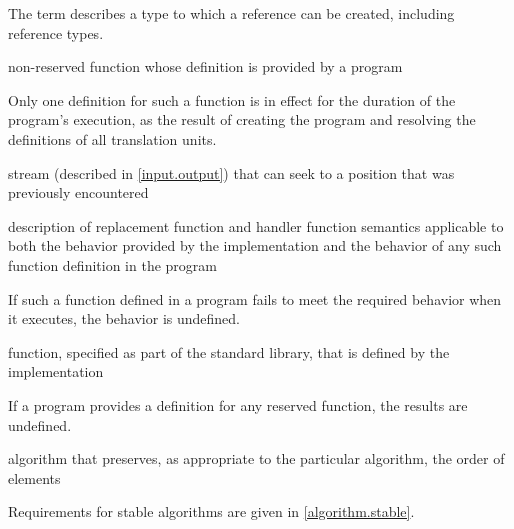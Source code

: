 \begin{defnote}
The term describes a type to which a reference can be created,
including reference types.
\end{defnote}

%
non-reserved function
whose definition is provided by a \Cpp{} program

\begin{defnote}
Only one definition for such a function is in effect for the duration of the program's
execution, as the result of creating the program and resolving the
definitions of all translation units.
\end{defnote}

%
stream (described in \ref{input.output}) that can seek to a position that was
previously encountered

%
description of replacement function and handler function semantics
applicable to both the behavior provided by the implementation and
the behavior of any such function definition in the program

\begin{defnote}
If such a function defined in a \Cpp{} program fails to meet the required
behavior when it executes, the behavior is undefined.%
\end{defnote}

%
function, specified as part of the \Cpp{} standard library, that is defined by the
implementation

\begin{defnote}
If a \Cpp{} program provides a definition for any reserved function, the results are undefined.%
\end{defnote}

%
%
algorithm that preserves, as appropriate to the particular algorithm, the order
of elements

\begin{defnote}
Requirements for stable algorithms are given in \ref{algorithm.stable}.
\end{defnote}

